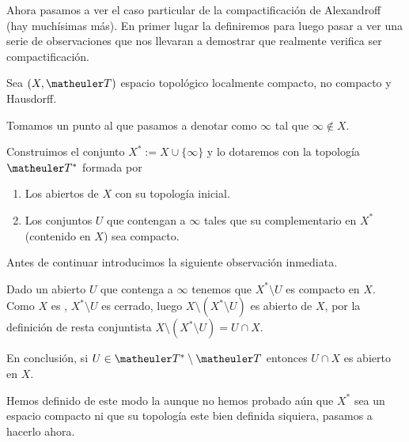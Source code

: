 Ahora pasamos a ver el caso particular de la compactificación de Alexandroff (hay muchísimas más). En primer lugar la definiremos para luego pasar a ver una serie de observaciones que nos llevaran a demostrar que realmente verifica ser compactificación.
\begin{defi}
	Sea $(X,\T)$ espacio topológico localmente compacto, no compacto y Hausdorff.
	
	Tomamos un punto al que pasamos a denotar como $\infty$ tal que  $\infty\notin X$.
	
	Construimos el conjunto $X^*:=X\cup\{\infty\}$ y lo dotaremos con la topología $\T^*$ formada por
	\begin{enumerate}
		\item Los abiertos de $X$ con su topología inicial.
		\item Los conjuntos $U$ que contengan a $\infty$ tales que su complementario en $X^*$ (contenido en $X$) sea compacto.
	\end{enumerate}
\end{defi}
Antes de continuar introducimos la siguiente observación inmediata.
\begin{obs}
	\label{comp_obs_condAbert}
	Dado un abierto $U$ que contenga a $\infty$ tenemos que $X^*\setminus U$ es compacto en $X$. Como $X$ es \hausdorff, $X^*\setminus U$ es cerrado, luego $X\setminus(X^*\setminus U)$ es abierto de $X$, por la definición de resta conjuntista $X\setminus(X^*\setminus U)=U\cap X$.
	
	En conclusión, si $U\in\T^*\setminus \T$ entonces $U\cap X$ es abierto en $X$.
\end{obs}
Hemos definido de este modo la  aunque no hemos probado aún que $X^*$ sea un espacio compacto ni que su topología este bien definida siquiera, pasamos a hacerlo ahora.

